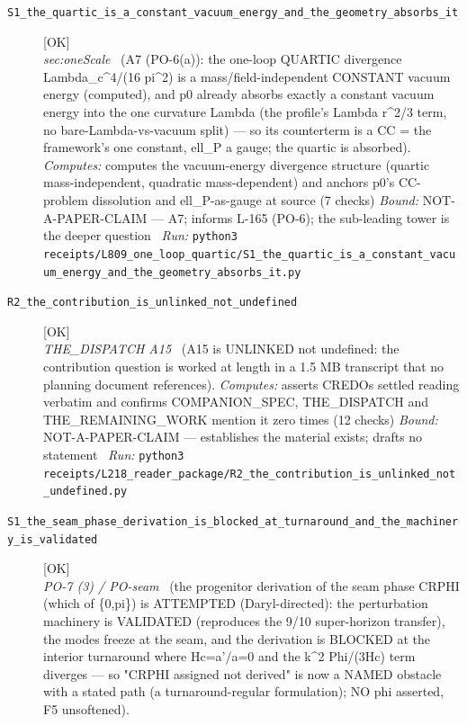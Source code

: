 \begin{description}
\item[\label{rcpt:S1_the_quartic_is_a_constant_vacuum_energy_and_the_geometry_absorbs_it}\texttt{S1\_the\_quartic\_is\_a\_constant\_vacuum\_energy\_and\_the\_geometry\_absorbs\_it}]\hfill\textsf{[OK]}\\
\textit{sec:oneScale} \ (A7 (PO-6(a)): the one-loop QUARTIC divergence Lambda\_c\textasciicircum{}4/(16 pi\textasciicircum{}2) is a mass/field-independent CONSTANT vacuum energy (computed), and p0 already absorbs exactly a constant vacuum energy into the one curvature Lambda (the profile's Lambda r\textasciicircum{}2/3 term, no bare-Lambda-vs-vacuum split) --- so its counterterm is a CC = the framework's one constant, ell\_P a gauge; the quartic is absorbed). 
\emph{Computes:} computes the vacuum-energy divergence structure (quartic mass-independent, quadratic mass-dependent) and anchors p0's CC-problem dissolution and ell\_P-as-gauge at source (7 checks)
 \emph{Bound:} NOT-A-PAPER-CLAIM --- A7; informs L-165 (PO-6); the sub-leading tower is the deeper question
\ \emph{Run:} \texttt{python3 receipts/L809\_one\_loop\_quartic/S1\_the\_quartic\_is\_a\_constant\_vacuum\_energy\_and\_the\_geometry\_absorbs\_it.py}
\item[\label{rcpt:R2_the_contribution_is_unlinked_not_undefined}\texttt{R2\_the\_contribution\_is\_unlinked\_not\_undefined}]\hfill\textsf{[OK]}\\
\textit{THE\_DISPATCH A15} \ (A15 is UNLINKED not undefined: the contribution question is worked at length in a 1.5 MB transcript that no planning document references). 
\emph{Computes:} asserts CREDOs settled reading verbatim and confirms COMPANION\_SPEC, THE\_DISPATCH and THE\_REMAINING\_WORK mention it zero times (12 checks)
 \emph{Bound:} NOT-A-PAPER-CLAIM --- establishes the material exists; drafts no statement
\ \emph{Run:} \texttt{python3 receipts/L218\_reader\_package/R2\_the\_contribution\_is\_unlinked\_not\_undefined.py}
\item[\label{rcpt:S1_the_seam_phase_derivation_is_blocked_at_turnaround_and_the_machinery_is_validated}\texttt{S1\_the\_seam\_phase\_derivation\_is\_blocked\_at\_turnaround\_and\_the\_machinery\_is\_validated}]\hfill\textsf{[OK]}\\
\textit{PO-7 (3) / PO-seam} \ (the progenitor derivation of the seam phase CRPHI (which of \{0,pi\}) is ATTEMPTED (Daryl-directed): the perturbation machinery is VALIDATED (reproduces the 9/10 super-horizon transfer), the modes freeze at the seam, and the derivation is BLOCKED at the interior turnaround where Hc=a'/a=0 and the k\textasciicircum{}2 Phi/(3Hc) term diverges --- so "CRPHI assigned not derived" is now a NAMED obstacle with a stated path (a turnaround-regular formulation); NO phi asserted, F5 unsoftened). 

\end{description}
